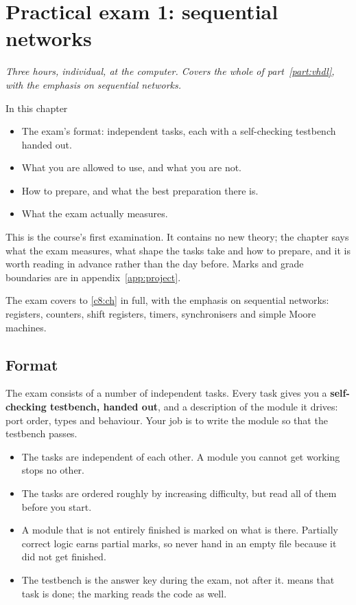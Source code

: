
\chapter{Practical exam 1: sequential networks}
\label{c9:ch}

{\large\itshape Three hours, individual, at the computer. Covers the whole of part~\ref{part:vhdl},
with the emphasis on sequential networks.\par}

\begin{chapterbox}{In this chapter}
\begin{itemize}
  \item The exam's format: independent tasks, each with a self-checking testbench handed out.
  \item What you are allowed to use, and what you are not.
  \item How to prepare, and what the best preparation there is.
  \item What the exam actually measures.
\end{itemize}
\end{chapterbox}

This is the course's first examination. It contains no new theory; the chapter says what the exam
measures, what shape the tasks take and how to prepare, and it is worth reading in advance rather
than the day before. Marks and grade boundaries are in appendix~\ref{app:project}.

The exam covers  to \ref{c8:ch} in full, with the emphasis on sequential networks:
registers, counters, shift registers, timers, synchronisers and simple Moore machines.

\section{Format}
\label{c9:sec:format}

The exam consists of a number of independent tasks. Every task gives you a \textbf{self-checking
testbench, handed out}, and a description of the module it drives: port order, types and behaviour.
Your job is to write the module so that the testbench passes.

\begin{itemize}
  \item The tasks are independent of each other. A module you cannot get working stops no other.
  \item The tasks are ordered roughly by increasing difficulty, but read all of them before you
    start.
  \item A module that is not entirely finished is marked on what is there. Partially correct logic
    earns partial marks, so never hand in an empty file because it did not get finished.
  \item The testbench is the answer key during the exam, not after it. 
    means that task is done; the marking reads the code as well.
\end{itemize}

